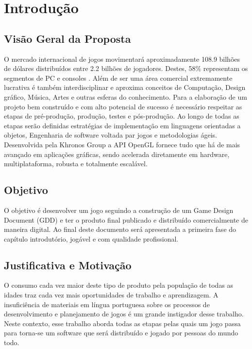 \documentclass[12pt, 
openright, 
oneside, 
a4paper,    
brazil]{facom-ufu-abntex2}
\begin{document}
\tableofcontents*
\cleardoublepage






\chapter{Introdução}

\section{Visão Geral da Proposta}
O mercado internacional de jogos movimentará aproximadamente 108.9
bilhões de dólares distribuídos entre 2.2 bilhões de jogadores. Destes, 58\%
representam os segmentos de PC e consoles \cite{GameMarketArticle}. Além de ser uma área
comercial extremamente lucrativa é também interdisciplinar e aproxima
conceitos de Computação, Design gráfico, Música, Artes e outras esferas do
conhecimento.
Para a elaboração de um projeto bem construído e com alto potencial de
sucesso é necessário respeitar as etapas de pré-produção, produção, testes
e pós-produção. Ao longo de todas as etapas serão definidas estratégias de
implementação em linguagens orientadas a objetos, Engenharia de software
voltada par jogos e metodologias ágeis.
Desenvolvida pela Khronos Group a API OpenGL fornece tudo que há de mais
avançado em aplicações gráficas, sendo acelerada diretamente em
hardware, multiplataforma, robusta e totalmente escalável.


\section{Objetivo}
O objetivo é desenvolver um jogo seguindo a construção de um Game Design
Document (GDD) e ter o produto final publicado e distribuído
comercialmente de maneira digital. Ao final deste documento será
apresentada a primeira fase do capítulo introdutório, jogável e com
qualidade profissional.

\section{Justificativa e Motivação}
O consumo cada vez maior deste tipo de produto pela população de todas as idades traz cada vez mais oportunidades de trabalho e aprendizagem.
A insuficiência de materiais em língua portuguesa sobre os processos de desenvolvimento e planejamento de jogos é um grande instigador desse trabalho. Neste contexto, esse trabalho aborda todas as etapas pelas quais um jogo passa para torna-se um software que será distribuído e jogado por pessoas do mundo todo.
\end{document}

